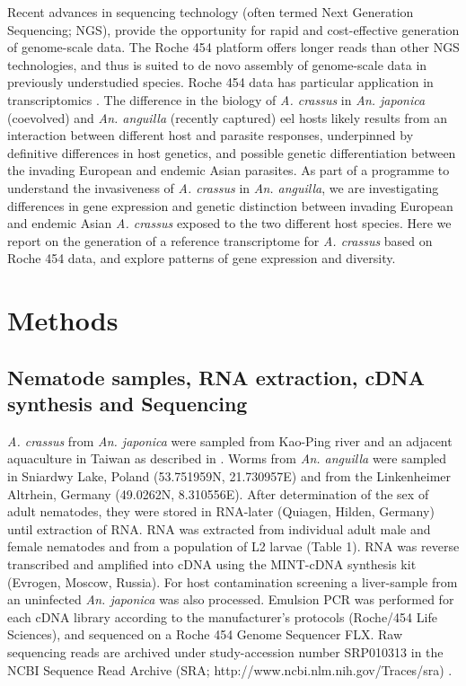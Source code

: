 \documentclass[10pt]{bmc_article}
\newenvironment{bmcformat}{\begin{raggedright}\baselineskip20pt\sloppy\setboolean{publ}{false}}{\end{raggedright}\baselineskip20pt\sloppy}
\begin{document}
\begin{bmcformat}
Recent advances in sequencing technology (often termed Next Generation
Sequencing; NGS), provide the opportunity for rapid and cost-effective
generation of genome-scale data. The Roche 454 platform
\cite{pmid16056220} offers longer reads than other NGS technologies,
and thus is suited to de novo assembly of genome-scale data in
previously understudied species. Roche 454 data has particular
application in transcriptomics \cite{pmid20950480}. The difference in
the biology of \textit{A. crassus} in \textit{An. japonica}
(coevolved) and \textit{An. anguilla} (recently captured) eel hosts
likely results from an interaction between different host and parasite
responses, underpinned by definitive differences in host genetics, and
possible genetic differentiation between the invading European and
endemic Asian parasites. As part of a programme to understand the
invasiveness of \textit{A. crassus} in \textit{An. anguilla}, we are
investigating differences in gene expression and genetic distinction
between invading European and endemic Asian \textit{A. crassus}
exposed to the two different host species. Here we report on the
generation of a reference transcriptome for \textit{A. crassus} based
on Roche 454 data, and explore patterns of gene expression and
diversity.


\section*{Methods}


\subsection*{Nematode samples, RNA extraction, cDNA synthesis and Sequencing}

\textit{A. crassus} from \textit{An. japonica} were sampled from
Kao-Ping river and an adjacent aquaculture in Taiwan as described in
\cite{heitlinger_massive_2009}. Worms from \textit{An. anguilla} were
sampled in Sniardwy Lake, Poland (53.751959N, 21.730957E) and from the
Linkenheimer Altrhein, Germany (49.0262N, 8.310556E). After
determination of the sex of adult nematodes, they were stored in
RNA-later (Quiagen, Hilden, Germany) until extraction of RNA. RNA was
extracted from individual adult male and female nematodes and from a
population of L2 larvae (Table 1). RNA was reverse transcribed and
amplified into cDNA using the MINT-cDNA synthesis kit (Evrogen,
Moscow, Russia). For host contamination screening a liver-sample from
an uninfected \textit{An. japonica} was also processed. Emulsion PCR
was performed for each cDNA library according to the manufacturer’s
protocols (Roche/454 Life Sciences), and sequenced on a Roche 454
Genome Sequencer FLX.  Raw sequencing reads are archived under
study-accession number SRP010313 in the NCBI Sequence Read Archive
(SRA; http://www.ncbi.nlm.nih.gov/Traces/sra) \cite{pmid22140104}.


\end{bmcformat}
\end{document}
